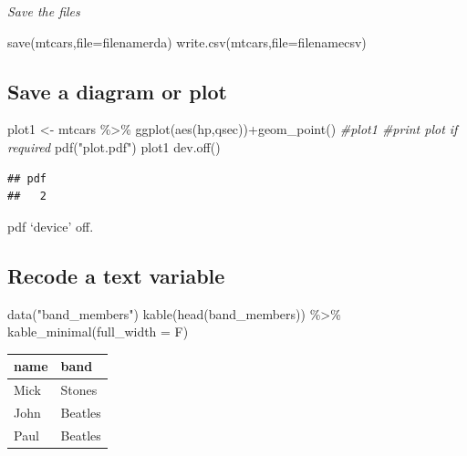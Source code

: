 \documentclass[
]{article}
\newenvironment{Shaded}{\begin{snugshade}}{\end{snugshade}}
\newcommand{\AttributeTok}[1]{\textcolor[rgb]{0.77,0.63,0.00}{#1}}
\newcommand{\CommentTok}[1]{\textcolor[rgb]{0.56,0.35,0.01}{\textit{#1}}}
\newcommand{\FunctionTok}[1]{\textcolor[rgb]{0.00,0.00,0.00}{#1}}
\newcommand{\NormalTok}[1]{#1}
\newcommand{\OtherTok}[1]{\textcolor[rgb]{0.56,0.35,0.01}{#1}}
\newcommand{\SpecialCharTok}[1]{\textcolor[rgb]{0.00,0.00,0.00}{#1}}
\newcommand{\StringTok}[1]{\textcolor[rgb]{0.31,0.60,0.02}{#1}}
\begin{document}
\emph{Save the files}

\begin{Shaded}
\begin{Highlighting}[]
\FunctionTok{save}\NormalTok{(mtcars,}\AttributeTok{file=}\NormalTok{filenamerda)}
\FunctionTok{write.csv}\NormalTok{(mtcars,}\AttributeTok{file=}\NormalTok{filenamecsv)}
\end{Highlighting}
\end{Shaded}

\hypertarget{save-a-diagram-or-plot}{%
\subsection{Save a diagram or plot}\label{save-a-diagram-or-plot}}

\begin{Shaded}
\begin{Highlighting}[]
\NormalTok{plot1 }\OtherTok{\textless{}{-}}\NormalTok{ mtcars }\SpecialCharTok{\%\textgreater{}\%} \FunctionTok{ggplot}\NormalTok{(}\FunctionTok{aes}\NormalTok{(hp,qsec))}\SpecialCharTok{+}\FunctionTok{geom\_point}\NormalTok{()}
\CommentTok{\#plot1 \#print plot if required}
\FunctionTok{pdf}\NormalTok{(}\StringTok{"plot.pdf"}\NormalTok{)}
\NormalTok{plot1}
\FunctionTok{dev.off}\NormalTok{()}
\end{Highlighting}
\end{Shaded}

\begin{verbatim}
## pdf 
##   2
\end{verbatim}

pdf `device' off.

\hypertarget{recode-a-text-variable}{%
\subsection{Recode a text variable}\label{recode-a-text-variable}}

\begin{Shaded}
\begin{Highlighting}[]
\FunctionTok{data}\NormalTok{(}\StringTok{"band\_members"}\NormalTok{)}
\FunctionTok{kable}\NormalTok{(}\FunctionTok{head}\NormalTok{(band\_members)) }\SpecialCharTok{\%\textgreater{}\%} \FunctionTok{kable\_minimal}\NormalTok{(}\AttributeTok{full\_width =}\NormalTok{ F)}
\end{Highlighting}
\end{Shaded}

\begin{table}
\centering
\begin{tabular}{l|l}
\hline
name & band\\
\hline
Mick & Stones\\
\hline
John & Beatles\\
\hline
Paul & Beatles\\
\hline
\end{tabular}
\end{table}
\end{document}
